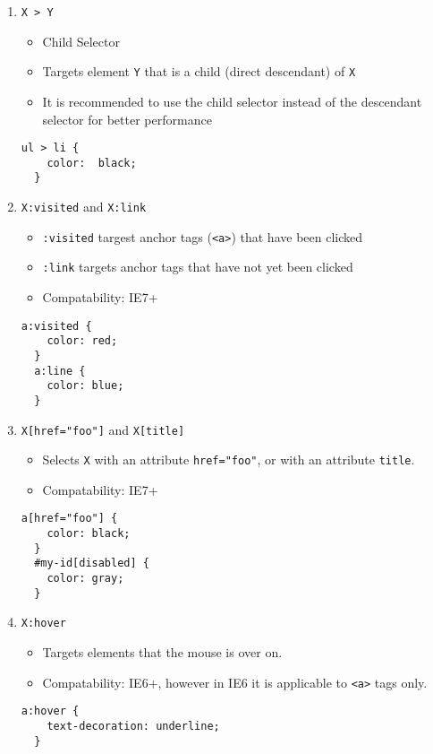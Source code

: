 \documentclass[12pt]{article}
\begin{document}
\begin{enumerate}
\item {\texttt{X > Y}}
  \begin{itemize}
    \item Child Selector
    \item Targets element \texttt{Y} that is a child (direct descendant) of \texttt{X}
    \item It is recommended to use the child selector instead of the descendant selector for better performance
  \end{itemize}
  \begin{lstlisting}[frame=single]
  ul > li {
    color:  black;
  }
  \end{lstlisting}  

\item {\texttt{X:visited} and \texttt{X:link}}
  \begin{itemize}
    \item \texttt{:visited} targest anchor tags (\texttt{<a>}) that have been clicked
    \item \texttt{:link} targets anchor tags that have not yet been clicked
    \item Compatability: IE7+
  \end{itemize}
  \begin{lstlisting}[frame=single]
  a:visited {
    color: red;
  }
  a:line {
    color: blue;
  }
  \end{lstlisting}

\item {\texttt{X[href="foo"]} and \texttt{X[title]}}
  \begin{itemize}
    \item Selects \texttt{X} with an attribute \texttt{href="foo"}, or with an attribute \texttt{title}.
    \item Compatability: IE7+
  \end{itemize}
  \begin{lstlisting}[frame=single]
  a[href="foo"] {
    color: black;
  }
  #my-id[disabled] {
    color: gray;
  }
  \end{lstlisting}

\item {\texttt{X:hover}}
  \begin{itemize}
    \item Targets elements that the mouse is over on.
    \item Compatability: IE6+, however in IE6 it is applicable to \texttt{<a>} tags only.
  \end{itemize}
  \begin{lstlisting}[frame=single]
  a:hover {
    text-decoration: underline;
  }
  \end{lstlisting}


\end{enumerate}
\end{document}
